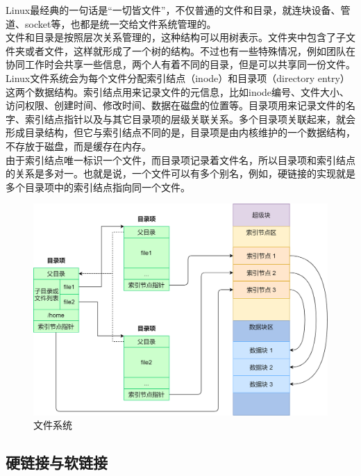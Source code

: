 Linux最经典的一句话是``一切皆文件”，不仅普通的文件和目录，就连块设备、管道、socket等，也都是统一交给文件系统管理的。\\

文件和目录是按照层次关系管理的，这种结构可以用树表示。文件夹中包含了子文件夹或者文件，这样就形成了一个树的结构。不过也有一些特殊情况，例如团队在协同工作时会共享一些信息，两个人有着不同的目录，但是可以共享同一份文件。\\

Linux文件系统会为每个文件分配索引结点（inode）和目录项（directory entry）这两个数据结构。索引结点用来记录文件的元信息，比如inode编号、文件大小、访问权限、创建时间、修改时间、数据在磁盘的位置等。目录项用来记录文件的名字、索引结点指针以及与其它目录项的层级关联关系。多个目录项关联起来，就会形成目录结构，但它与索引结点不同的是，目录项是由内核维护的一个数据结构，不存放于磁盘，而是缓存在内存。\\

由于索引结点唯一标识一个文件，而目录项记录着文件名，所以目录项和索引结点的关系是多对一。也就是说，一个文件可以有多个别名，例如，硬链接的实现就是多个目录项中的索引结点指向同一个文件。

\begin{figure}[H]
	\centering
	\includegraphics[scale=0.35]{img/Chapter5/5-3/1.png}
	\caption{文件系统}
\end{figure}

\vspace{0.5cm}

\subsection{硬链接与软链接}


